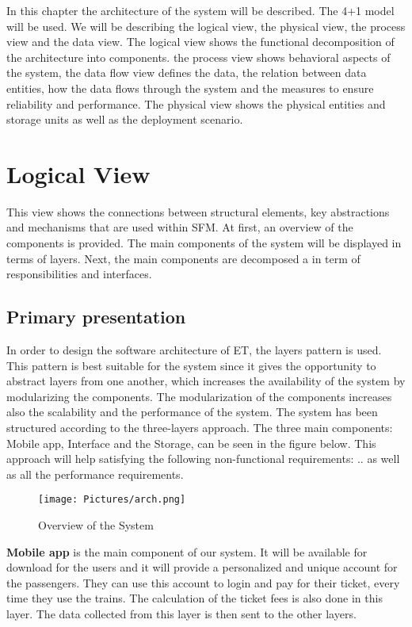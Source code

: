 In this chapter the architecture of the system will be described. The 4+1 model will be used. We will be describing  the logical view, the physical view, the process view and the data view. 
The logical view shows the functional decomposition of the architecture into components.
the process view shows behavioral aspects of the system, the data flow view defines the data, the relation
between data entities, how the data flows through the system and the measures to ensure reliability and
performance. The physical view shows the physical entities and storage units as well as the deployment
scenario.

\section{Logical View}
This view shows the connections between structural elements, key abstractions and mechanisms that are used within SFM. At first, an overview of the components is provided. The main components of the system will be displayed in terms of layers. Next, the main components are decomposed a in term of responsibilities and interfaces.

\subsection{Primary presentation}
In order to design the software architecture of \ac{ET}, the layers pattern is used. This pattern is best suitable for the system since it gives the opportunity to abstract layers from one another, which increases the availability of the system by modularizing the components. The modularization of the components increases also the scalability and the performance of the system. 
The system has been structured according to the three-layers approach. The three main components: Mobile app, Interface and the Storage, can be seen in the figure below. This approach will help satisfying the following non-functional
requirements: .. as well as all the performance requirements.


\begin{figure}[H]
  \centering
  \texttt{[image: Pictures/arch.png]}
  \caption{Overview of the System}
  \label{fig:system}
\end{figure}


\textbf{Mobile app} is the main component of our system. It will be available for download for the users and it will provide a personalized and unique account for the passengers. They can use this account to login and pay for their ticket, every time they use the trains. The calculation of the ticket fees is also done in this layer. The data collected from this layer is then sent to the other layers.

